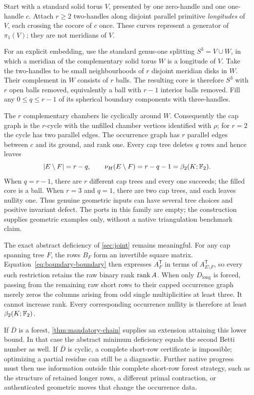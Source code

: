 \begin{example}
\label{ex:geometric-cycle}
Start with a standard solid torus $V$, presented by one zero-handle and one
one-handle $c$. Attach $r\geq2$ two-handles along disjoint parallel primitive
\emph{longitudes} of $V$, each crossing the cocore of $c$ once. These curves
represent a generator of $\pi_1(V)$; they are not meridians of $V$.

For an explicit embedding, use the standard genus-one splitting
$S^3=V\cup W$, in which a meridian of the complementary solid torus $W$ is
a longitude of $V$. Take the two-handles to be small neighbourhoods of $r$
disjoint meridian disks in $W$. Their complement in $W$ consists of $r$
balls. The resulting core is therefore $S^3$ with $r$ open balls removed,
equivalently a ball with $r-1$ interior balls removed. Fill any $0\leq q\leq r-1$
of its spherical boundary components with three-handles.

The $r$ complementary chambers lie cyclically around $W$. Consequently
the cap graph is the $r$-cycle with the unfilled chamber vertices
identified with $\rho$; for $r=2$ the cycle has two parallel edges.
The occurrence graph has $r$ parallel edges between $c$ and its ground,
and rank one. Every cap tree deletes $q$ rows and hence leaves
\[
 |E\setminus F|=r-q,\qquad
 \nu_H(E\setminus F)=r-q-1=\beta_2(K;\mathbb F_2).
\]
When $q=r-1$, there are $r$ different cap trees and every one succeeds;
the filled core is a ball. When $r=3$ and $q=1$, there are two cap trees,
and each leaves nullity one. Thus genuine geometric inputs can have
several tree choices and positive invariant defect. The ports in this
family are empty; the construction supplies geometric examples only,
without a native triangulation benchmark claim.
\end{example}

The exact abstract deficiency of \cref{sec:joint} remains meaningful.
For any cap spanning tree $F$, the rows $B_F$ form an invertible square
matrix. Equation~\eqref{eq:boundary-boundary} then expresses $A_F^{\mathsf T}$
in terms of $A_{E\setminus F}^{\mathsf T}$, so every such restriction retains
the raw binary rank $\operatorname{rank} A$. When only $D_{\mathrm{long}}$ is forced,
passing from the remaining raw short rows to their capped occurrence graph
merely zeros the columns arising from odd single multiplicities at least
three. It cannot increase rank. Every corresponding occurrence nullity is
therefore at least $\beta_2(K;\mathbb F_2)$.

If $\overline D$ is a forest, \cref{thm:mandatory-chain} supplies an extension
attaining this lower bound. In that case the abstract minimum deficiency
equals the second Betti number as well. If $\overline D$ is cyclic, a
complete short-row certificate is impossible; optimizing a partial
residue can still be a diagnostic. Further native progress must then use
information outside this complete short-row forest strategy, such as the
structure of retained longer rows, a different primal contraction, or
authenticated geometric moves that change the occurrence data.
